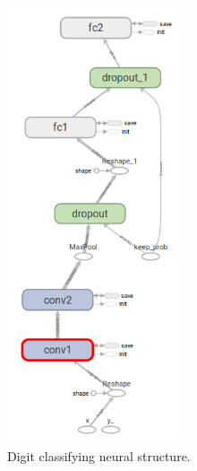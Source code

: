 			\begin{figure}[h]
				\centering
				\includegraphics[width=2in]{images/digitclassifier_network_graph}
				\caption{Digit classifying neural structure.}
				\label{fig:3_digitclassifier_neural_structure}
				\end{figure}
				
				
				
